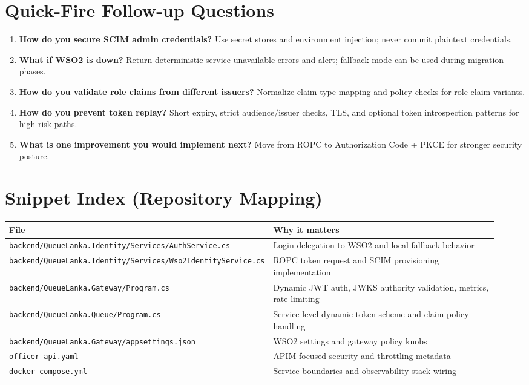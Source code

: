 \documentclass[11pt,a4paper]{article}
\begin{document}
\section{Quick-Fire Follow-up Questions}
\begin{enumerate}[leftmargin=*]
  \item \textbf{How do you secure SCIM admin credentials?} Use secret stores and environment injection; never commit plaintext credentials.
  \item \textbf{What if WSO2 is down?} Return deterministic service unavailable errors and alert; fallback mode can be used during migration phases.
  \item \textbf{How do you validate role claims from different issuers?} Normalize claim type mapping and policy checks for role claim variants.
  \item \textbf{How do you prevent token replay?} Short expiry, strict audience/issuer checks, TLS, and optional token introspection patterns for high-risk paths.
  \item \textbf{What is one improvement you would implement next?} Move from ROPC to Authorization Code + PKCE for stronger security posture.
\end{enumerate}

\section{Snippet Index (Repository Mapping)}
\begin{longtable}{p{0.42\linewidth} p{0.52\linewidth}}
\textbf{File} & \textbf{Why it matters} \\
\hline
\texttt{backend/QueueLanka.Identity/Services/AuthService.cs} & Login delegation to WSO2 and local fallback behavior \\
\texttt{backend/QueueLanka.Identity/Services/Wso2IdentityService.cs} & ROPC token request and SCIM provisioning implementation \\
\texttt{backend/QueueLanka.Gateway/Program.cs} & Dynamic JWT auth, JWKS authority validation, metrics, rate limiting \\
\texttt{backend/QueueLanka.Queue/Program.cs} & Service-level dynamic token scheme and claim policy handling \\
\texttt{backend/QueueLanka.Gateway/appsettings.json} & WSO2 settings and gateway policy knobs \\
\texttt{officer-api.yaml} & APIM-focused security and throttling metadata \\
\texttt{docker-compose.yml} & Service boundaries and observability stack wiring \\
\end{longtable}
\end{document}
